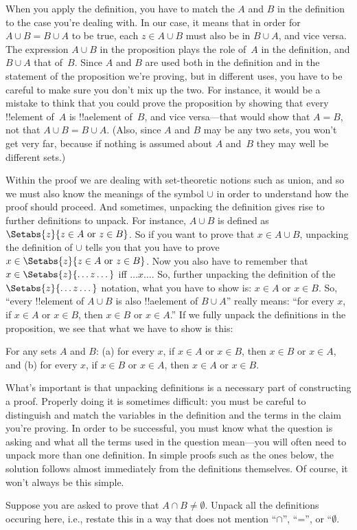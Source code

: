 \documentclass[../../../include/open-logic-section]{subfiles}
\begin{document}
When you apply the definition, you have to match the $A$ and $B$ in
the definition to the case you're dealing with.  In our case, it means
that in order for $A \cup B = B \cup A$ to be true, each $z \in A \cup
B$ must also be in $B \cup A$, and vice versa.  The expression $A \cup
B$ in the proposition plays the role of~$A$ in the definition, and $B
\cup A$ that of~$B$. Since $A$ and $B$ are used both in the definition
and in the statement of the proposition we're proving, but in
different uses, you have to be careful to make sure you don't mix up
the two.  For instance, it would be a mistake to think that you could
prove the proposition by showing that every !!{element} of~$A$ is
!!a{element} of~$B$, and vice versa---that would show that $A = B$,
not that $A \cup B = B \cup A$. (Also, since $A$ and $B$ may be any
two sets, you won't get very far, because if nothing is assumed about
$A$ and~$B$ they may well be different sets.)

Within the proof we are dealing with set-theoretic notions such as
union, and so we must also know the meanings of the symbol $\cup$ in
order to understand how the proof should proceed. And sometimes,
unpacking the definition gives rise to further definitions to
unpack. For instance, $A \cup B$ is defined as $\Setabs{z}{z \in A
  \text{ or } z \in B}$. So if you want to prove that $x \in A \cup
B$, unpacking the definition of $\cup$ tells you that you have to
prove $x \in \Setabs{z}{z \in A \text{ or } z \in B}$.  Now you also
have to remember that $x \in \Setabs{z}{\dots z\dots}$ iff $\dots
x\dots$.  So, further unpacking the definition of the
$\Setabs{z}{\dots z \dots}$ notation, what you have to show is: $x \in
A$ or $x \in B$. So, ``every !!{element} of $A \cup B$ is also
!!a{element} of $B \cup A$'' really means: ``for every $x$, if $x \in
A$ or $x \in B$, then $x \in B$ or $x \in A$.''  If we fully
unpack the definitions in the proposition, we see that what we have to
show is this:

\begin{prop}
For any sets $A$ and $B$: (a) for every $x$, if $x \in A$ or $x \in
B$, then $x \in B$ or $x \in A$, and (b) for every $x$, if $x \in B$
or $x \in A$, then $x \in A$ or $x \in B$.
\end{prop}

What's important is that unpacking definitions is a necessary part of
constructing a proof. Properly doing it is sometimes difficult: you
must be careful to distinguish and match the variables in the
definition and the terms in the claim you're proving.  In order to be
successful, you must know what the question is asking and what all the
terms used in the question mean---you will often need to unpack more
than one definition.  In simple proofs such as the ones below, the
solution follows almost immediately from the definitions
themselves. Of course, it won't always be this simple.

\begin{prob}
Suppose you are asked to prove that $A \cap B \neq \emptyset$. Unpack
all the definitions occuring here, i.e., restate this in a way that
does not mention ``$\cap$'', ``='', or ``$\emptyset$.
\end{prob}
\end{document}
